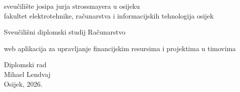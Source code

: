 \documentclass[a4paper,12pt,oneside]{article}
\begin{document}
	
	
	\setcounter{MaxMatrixCols}{20}                          %
	\renewcommand{\baselinestretch}{1.5}                    %
	\renewcommand{\thefigure}{\thesection.\arabic{figure}}  %
	\renewcommand{\thetable}{\thesection.\arabic{table}}   %
	\renewcommand{\theequation}{\thesection-\arabic{equation}} %
	
	
	
	
	
	
	\begin{titlepage}
		
		\begin{center}{\sc\Large sveučilište josipa jurja strossmayera u osijeku}\\{\sc\Large fakultet elektrotehnike, računarstva i informacijskih tehnologija osijek}\\
			\bigskip
			
			\vspace*{2cm}
			{\large Sveučilišni diplomski studij Računarstvo}\\
			
			\vspace*{5cm}
			
			{\sc\LARGE web aplikacija za upravljanje financijskim resursima i projektima u timovima}
			
			\vspace*{1cm}
			{\large Diplomski rad}\\
			\vspace*{3cm}
			{\Large Mihael Lendvaj}\\
			\vspace*{8cm}
			{\normalsize Osijek, 2026.}
		\end{center}
		
	\end{titlepage}
	
\end{document}
